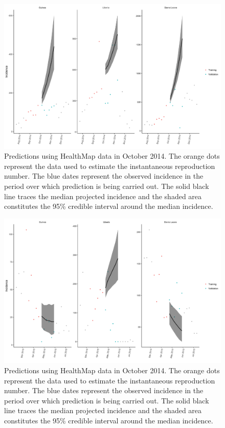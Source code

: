 \documentclass[11pt,]{article}
\begin{document}
\begin{figure}
  \centering
  \includegraphics[]{ms6-figures/hm_summary_projections_0.99_1_200}
  \caption{Predictions using HealthMap data in October 2014. The
    orange dots represent the data used to estimate the instantaneous
    reproduction number. The blue dates represent the observed
    incidence in the period over which prediction is being carried
    out. The solid black line traces the median projected incidence
    and the shaded area constitutes the 95\% credible interval around
    the median incidence.}
  \label{fig:hm-prediction-200}
\end{figure}


\begin{figure}
  \centering
  \includegraphics[]{ms6-figures/hm_summary_projections_0.99_2_400}
  \caption{Predictions using HealthMap data in October 2014. The
    orange dots represent the data used to estimate the instantaneous
    reproduction number. The blue dates represent the observed
    incidence in the period over which prediction is being carried
    out. The solid black line traces the median projected incidence
    and the shaded area constitutes the 95\% credible interval around
    the median incidence.}
  \label{fig:hm-prediction-400}
\end{figure}
\FloatBarrier
\end{document}
